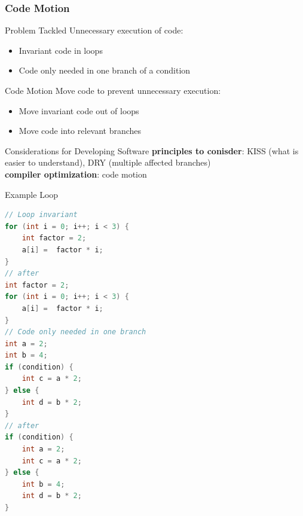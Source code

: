 \begin{frame}[fragile]
	\frametitle{Code Motion}
	\begin{fancycolumns}
		\begin{motivation}{Problem Tackled}
			Unnecessary execution of code:
			\begin{itemize}
				\item Invariant code in loops
				\item Code only needed in one branch of a condition
			\end{itemize}
		\end{motivation}
		\begin{definition}{{Code Motion}}
			Move code to prevent unnecessary execution:
			\begin{itemize}
				\item Move invariant code out of loops
				\item Move code into relevant branches
			\end{itemize}
		\end{definition}
		\begin{note}{Considerations for Developing Software}
			\textbf{principles to conisder}: KISS (what is easier to understand), DRY (multiple affected branches) \\\textbf{compiler optimization}: code motion
		\end{note}
		\nextcolumn
		\begin{example}{Example Loop}
			\begin{lstlisting}[language=Java,basicstyle=\scriptsize]
// Loop invariant
for (int i = 0; i++; i < 3) {
	int factor = 2;
	a[i] =  factor * i; 
}
// after
int factor = 2;
for (int i = 0; i++; i < 3) {
	a[i] =  factor * i;
}
// Code only needed in one branch
int a = 2;
int b = 4;
if (condition) {
	int c = a * 2;
} else {
	int d = b * 2;
}
// after
if (condition) {
	int a = 2;
	int c = a * 2;
} else {
	int b = 4;
	int d = b * 2;
}

			\end{lstlisting}
		\end{example}
	\end{fancycolumns}


\end{frame}

